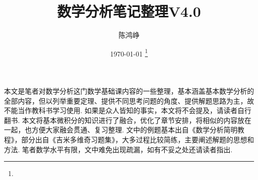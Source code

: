 \documentclass[11pt,UTF8]{ctexart}
\title{数学分析笔记整理V4.0}
\author{陈鸿峥}
\date{{\builddatemonth\today} \footnote{\text{Build \builddate\today}}}%
\renewcommand{\thefootnote}{\fnsymbol{footnote}}
\begin{document}
\maketitle
\renewcommand{\thefootnote}{\arabic{footnote}}
\setcounter{footnote}{0}

\setcounter{tocdepth}{2}%
\tableofcontents
\bigskip\bigskip\bigskip

\par 本文是笔者对数学分析这门数学基础课内容的一些整理，基本涵盖基本数学分析的全部内容，但以列举重要定理、提供不同思考问题的角度、提供解题思路为主，故不能当作教科书学习使用. 如果是众人皆知的事实，本文将不会提及，请读者自行翻书. 本文将基本微积分的知识进行了融合，优化了章节安排，将相似的内容放在一起，也方便大家融会贯通、复习整理. 文中的例题基本出自《数学分析简明教程》，部分出自《吉米多维奇习题集》，大多过程比较简练，主要阐述解题的思想和方法. 笔者数学水平有限，文中难免出现疏漏，如有不妥之处还请读者指出.
















\end{document}
